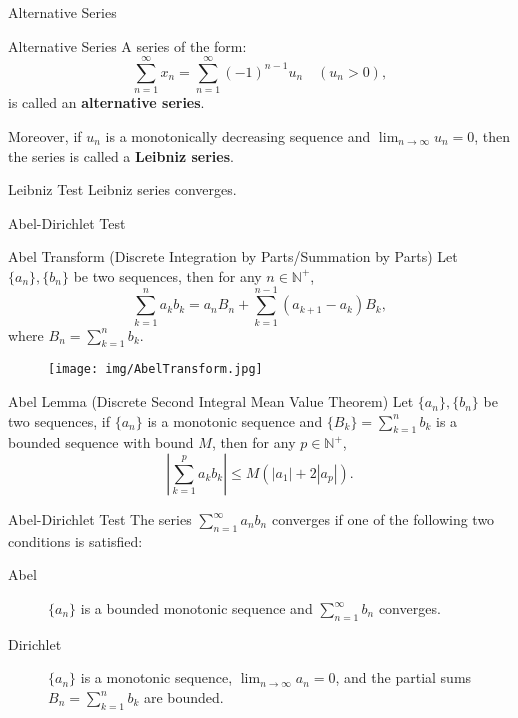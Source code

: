 \documentclass[11pt]{../../TexTemplate/elegantbook}
\begin{document}
\begin{leftbarTitle}{Alternative Series}\end{leftbarTitle}
\begin{definition}{Alternative Series}
    A series of the form:
    \[
    \sum_{n=1}^{\infty}x_{n} = 
    \sum_{n=1}^{\infty} (-1)^{n-1} u_n\quad (u_{n}>0),
    \]
    is called an \textbf{alternative series}.

    Moreover, if \( u_n \) is a monotonically decreasing sequence and \( \lim_{n \to \infty} u_n = 0 \), 
    then the series is called a \textbf{Leibniz series}.
\end{definition}

\begin{theorem}{Leibniz Test}
    Leibniz series converges.
\end{theorem}


\begin{leftbarTitle}{Abel-Dirichlet Test}\end{leftbarTitle}

\begin{theorem}{Abel Transform (Discrete Integration by Parts/Summation by Parts)}\label{thm:Abel Transform}
    Let \(\{a_n\}, \{b_n\}\) be two sequences, then for any \(n\in \mathbb{N}^{+}\),
    \[
        \sum_{k=1}^{n} a_k b_k = a_n B_n + \sum_{k=1}^{n-1} (a_{k+1} - a_{k})B_k,
    \]
    where \(B_n = \sum_{k=1}^{n} b_k\).
\end{theorem}

\begin{figure}[h]
    \centering
    \texttt{[image: img/AbelTransform.jpg]}
\end{figure}

\begin{lemma}{Abel Lemma (Discrete Second Integral Mean Value Theorem)}
    Let \(\{a_n\}, \{b_n\}\) be two sequences, if \(\{a_n\}\) is a monotonic sequence 
    and \(\{B_k\} = \sum_{k=1}^{n} b_k\) is a bounded sequence with bound \(M\),
    then for any \(p\in \mathbb{N}^{+}\),
    \[
        \left| \sum_{k=1}^{p} a_k b_k \right| \leq M \left( |a_{1}| + 2|a_{p}| \right) .
    \]
\end{lemma}

\begin{theorem}{Abel-Dirichlet Test}
    The series \(\sum_{n=1}^{\infty} a_n b_n\) converges if one of the following two conditions is satisfied:
    \begin{description}
        \item[Abel] \(\{a_n\}\) is a bounded monotonic sequence and \(\sum_{n=1}^{\infty} b_n\) converges.
        \item[Dirichlet]  \(\{a_n\}\) is a monotonic sequence, \(\lim_{n \to \infty} a_n = 0\),
            and the partial sums \(B_n = \sum_{k=1}^{n} b_k\) are bounded.       
    \end{description}
\end{theorem}
\end{document}

